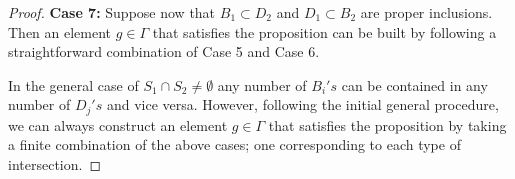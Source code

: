\documentclass[10pt,a4paper]{amsart}
\begin{document}
\begin{proof}
    \noindent \textbf{Case 7:} Suppose now that $B_1 \subset D_2$ and $D_1 \subset B_2$ are proper inclusions. Then an element $g \in \Gamma$ that satisfies the proposition can be built by following a straightforward combination of Case 5 and Case 6. 
    
    In the general case of $S_1 \cap S_2 \neq \emptyset$ any number of $B_i's$ can be contained in any number of $D_j's$ and vice versa. However, following the initial general procedure, we can always construct an element $g \in \Gamma$ that satisfies the proposition by taking a finite combination of the above cases; one corresponding to each type of intersection.

\end{proof}
\end{document}
